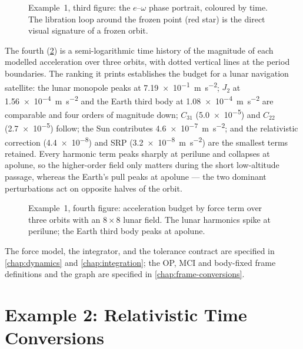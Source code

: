 \begin{figure}[htbp]
  \centering
  \caption{Example~1, third figure: the $e$--$\omega$ phase portrait, coloured
           by time. The libration loop around the frozen point (red star) is the
           direct visual signature of a frozen orbit.}
  \label{fig:tut-ex1-phase}
\end{figure}

The fourth (\cref{fig:tut-ex1-acc}) is a semi-logarithmic time history of the
magnitude of each modelled acceleration over three orbits, with dotted vertical
lines at the period boundaries. The ranking it prints establishes the budget
for a lunar navigation satellite: the lunar monopole peaks at
\SI{7.19e-1}{\meter\per\second\squared}; $J_2$ at
\SI{1.56e-4}{\meter\per\second\squared} and the Earth third body at
\SI{1.08e-4}{\meter\per\second\squared} are comparable and four orders of
magnitude down; $C_{31}$ (\SI{5.0e-5}{}) and $C_{22}$ (\SI{2.7e-5}{}) follow;
the Sun contributes \SI{4.6e-7}{\meter\per\second\squared}; and the relativistic
correction (\SI{4.4e-8}{}) and SRP (\SI{3.2e-8}{\meter\per\second\squared}) are
the smallest terms retained. Every harmonic term peaks sharply at perilune and
collapses at apolune, so the higher-order field only matters during the short
low-altitude passage, whereas the Earth's pull peaks at apolune --- the two
dominant perturbations act on opposite halves of the orbit.

\begin{figure}[htbp]
  \centering
  \caption{Example~1, fourth figure: acceleration budget by force term over
           three orbits with an $8\times8$ lunar field. The lunar harmonics
           spike at perilune; the Earth third body peaks at apolune.}
  \label{fig:tut-ex1-acc}
\end{figure}

The force model, the integrator, and the tolerance contract are specified in
\cref{chap:dynamics} and \cref{chap:integration}; the OP, MCI and body-fixed
frame definitions and the  graph are specified in
\cref{chap:frame-conversions}.

\section{Example 2: Relativistic Time Conversions}
\label{sec:tut-ex2}

